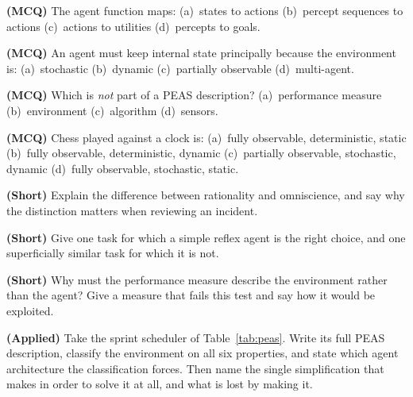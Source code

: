 \begin{reviewq}
  \item \textbf{(MCQ)} The agent function maps: (a)~states to actions (b)~percept
        sequences to actions (c)~actions to utilities (d)~percepts to goals.
  \item \textbf{(MCQ)} An agent must keep internal state principally because the
        environment is: (a)~stochastic (b)~dynamic (c)~partially observable
        (d)~multi-agent.
  \item \textbf{(MCQ)} Which is \emph{not} part of a PEAS description?
        (a)~performance measure (b)~environment (c)~algorithm (d)~sensors.
  \item \textbf{(MCQ)} Chess played against a clock is: (a)~fully observable,
        deterministic, static (b)~fully observable, deterministic, dynamic
        (c)~partially observable, stochastic, dynamic (d)~fully observable,
        stochastic, static.
  \item \textbf{(Short)} Explain the difference between rationality and
        omniscience, and say why the distinction matters when reviewing an
        incident.
  \item \textbf{(Short)} Give one task for which a simple reflex agent is the
        right choice, and one superficially similar task for which it is not.
  \item \textbf{(Short)} Why must the performance measure describe the environment
        rather than the agent? Give a measure that fails this test and say how it
        would be exploited.
  \item \textbf{(Applied)} Take the sprint scheduler of Table~\ref{tab:peas}. Write its
        full PEAS description, classify the environment on all six properties, and
        state which agent architecture the classification forces. Then name the
        single simplification that  makes in order to solve it at all,
        and what is lost by making it.
\end{reviewq}

